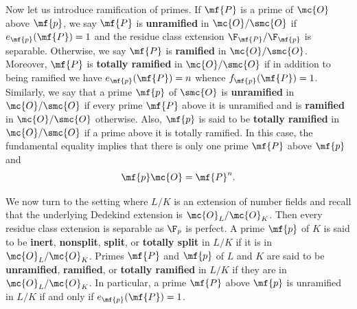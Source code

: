     Now let us introduce ramification of primes. If \(\mf{P}\) is a prime of \(\mc{O}\) above \(\mf{p}\), we say \(\mf{P}\) is \textbf{unramified} in \(\mc{O}/\smc{O}\) if \(e_{\mf{p}}(\mf{P}) = 1\) and the residue class extension \(\F_{\mf{P}}/\F_{\mf{p}}\) is separable. Otherwise, we say \(\mf{P}\) is \textbf{ramified} in \(\mc{O}/\smc{O}\). Moreover, \(\mf{P}\) is \textbf{totally ramified} in \(\mc{O}/\smc{O}\) if in addition to being ramified we have \(e_{\mf{p}}(\mf{P}) = n\) whence \(f_{\mf{p}}(\mf{P}) = 1\). Similarly, we say that a prime \(\mf{p}\) of \(\smc{O}\) is \textbf{unramified} in \(\mc{O}/\smc{O}\) if every prime \(\mf{P}\) above it is unramified and is \textbf{ramified} in \(\mc{O}/\smc{O}\) otherwise. Also, \(\mf{p}\) is said to be \textbf{totally ramified} in \(\mc{O}/\smc{O}\) if a prime above it is totally ramified. In this case, the fundamental equality implies that there is only one prime \(\mf{P}\) above \(\mf{p}\) and
    \[
      \mf{p}\mc{O} = \mf{P}^{n}.
    \]

    We now turn to the setting where \(L/K\) is an extension of number fields and recall that the underlying Dedekind extension is \(\mc{O}_{L}/\mc{O}_{K}\). Then every residue class extension is separable as \(\F_{p}\) is perfect. A prime \(\mf{p}\) of \(K\) is said to be \textbf{inert}, \textbf{nonsplit}, \textbf{split}, or \textbf{totally split} in \(L/K\) if it is in \(\mc{O}_{L}/\mc{O}_{K}\). Primes \(\mf{P}\) and \(\mf{p}\) of \(L\) and \(K\) are said to be \textbf{unramified}, \textbf{ramified}, or \textbf{totally ramified} in \(L/K\) if they are in \(\mc{O}_{L}/\mc{O}_{K}\). In particular, a prime \(\mf{P}\) above \(\mf{p}\) is unramified in \(L/K\) if and only if \(e_{\mf{p}}(\mf{P}) = 1\).
    

